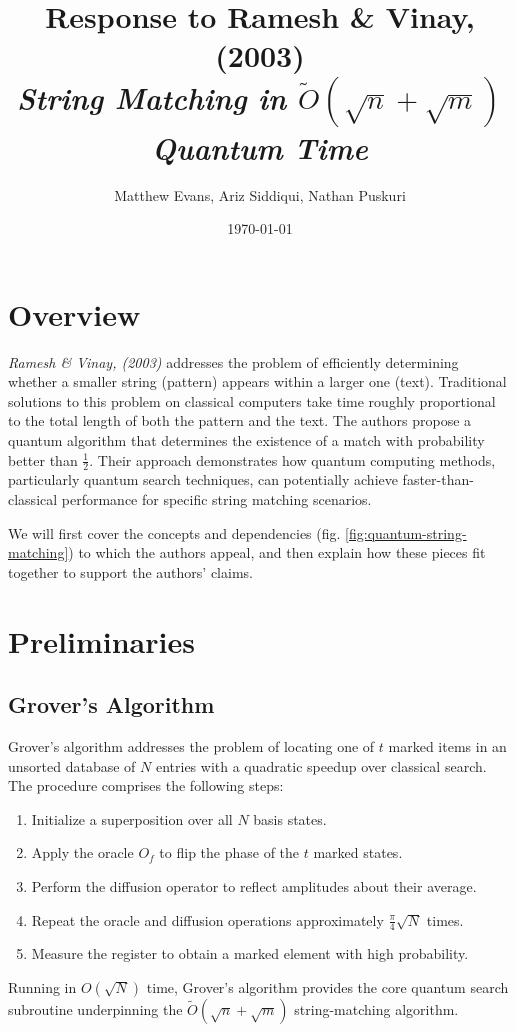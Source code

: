\documentclass[12pt]{IEEEtran}
\title{\Large{Response to Ramesh \& Vinay, (2003)\\ \small{\textit{String Matching in \(\tilde{O}(\sqrt{n} + \sqrt{m})\) Quantum Time}} }}
\author{%
\normalsize{Matthew Evans, Ariz Siddiqui, Nathan Puskuri}
}
\date{\today}
\begin{document}
\maketitle

\section{Overview}
\textit{Ramesh \& Vinay, (2003)}\cite{RameshH2003SmiO} addresses the problem of efficiently determining whether a smaller string (pattern) appears within a larger one (text). Traditional solutions to this problem on classical computers take time roughly proportional to the total length of both the pattern and the text. The authors propose a quantum algorithm that determines the existence of a match with probability better than \(\frac{1}{2}\). Their approach demonstrates how quantum computing methods, particularly quantum search techniques, can potentially achieve faster-than-classical performance for specific string matching scenarios.

We will first cover the concepts and dependencies (fig. \ref{fig:quantum-string-matching}) to which the authors appeal, and then explain how these pieces fit together to support the authors' claims.

\section{Preliminaries}
\subsection{Grover's Algorithm}
Grover's algorithm \cite{grover1996fastquantummechanicalalgorithm} addresses the problem of locating one of \(t\) marked items in an unsorted database of \(N\) entries with a quadratic speedup over classical search. The procedure comprises the following steps:
\begin{enumerate}
    \item Initialize a superposition over all \(N\) basis states.
    \item Apply the oracle \(O_f\) to flip the phase of the \(t\) marked states.
    \item Perform the diffusion operator to reflect amplitudes about their average.
    \item Repeat the oracle and diffusion operations approximately \(\frac{\pi}{4}\sqrt{N}\) times.
    \item Measure the register to obtain a marked element with high probability.
\end{enumerate}
Running in \(O(\sqrt{N})\) time, Grover's algorithm provides the core quantum search subroutine underpinning the \(\widetilde{O}(\sqrt{n}+\sqrt{m})\) string-matching algorithm.
\end{document}

